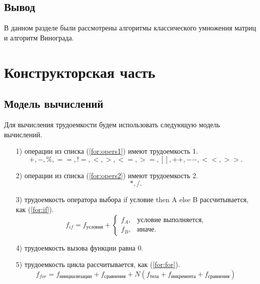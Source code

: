 \documentclass[12pt]{report}
\begin{document}
	\section*{Вывод}
	
	В данном разделе были рассмотрены алгоритмы классического умножения матриц и алгоритм Винограда.
	
	\chapter{Конструкторская часть}
	
	\section{Модель вычислений}

	Для вычисления трудоемкости будем использовать следующую модель вычислений.

	\begin{enumerate}
		\item[1)] операции из списка (\ref{for:opers1}) имеют трудоемкость 1.
		\begin{equation}
		\label{for:opers1}
		+, -, \%, ==, !=, <, >, <=, >=, [], ++, {-}-, {<}<, {>}>.
		\end{equation}
		\item[2)] операции из списка (\ref{for:opers2}) имеют трудоемкость 2.
		\begin{equation}
		\label{for:opers2}
		*, /.
		\end{equation}
		\item[3)] трудоемкость оператора выбора if условие then A else B рассчитывается, как (\ref{for:if}).
		\begin{equation}
		\label{for:if}
		f_{if} = f_{\text{условия}} +
		\begin{cases}
		f_A, & \text{условие выполняется,}\\
		f_B, & \text{иначе.}
		\end{cases}
		\end{equation}
		\item[4)] трудоемкость вызова функции равна 0.
		\item[5)] трудоемкость цикла рассчитывается, как (\ref{for:for}).
		\begin{equation}
		\label{for:for}
		f_{for} = f_{\text{инициализации}} + f_{\text{сравнения}} + N(f_{\text{тела}} + f_{\text{инкремента}} + f_{\text{сравнения}})
		\end{equation}
	\end{enumerate}
	
\end{document}
